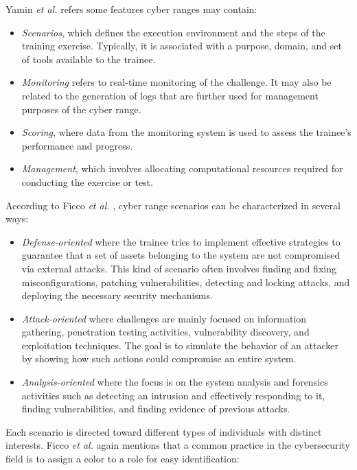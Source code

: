 Yamin \textit{et al.} \cite{cr_and_security_testbeds_ref} refers some features cyber ranges may contain:

\begin{itemize}
    \item \textit{Scenarios}, which defines the execution environment and the steps of the training exercise. Typically, it is associated with a purpose, domain, and set of tools available to the trainee.
    \item \textit{Monitoring} refers to real-time monitoring of the challenge. It may also be related to the generation of logs that are further used for management purposes of the cyber range.
    \item \textit{Scoring}, where data from the monitoring system is used to assess the trainee's performance and progress. 
    \item \textit{Management}, which involves allocating computational resources required for conducting the exercise or test. 
\end{itemize}

According to Ficco \textit{et al.} \cite{leaf_ref}, cyber range scenarios can be characterized in several ways:

\begin{itemize}
    \item \textit{Defense-oriented} where the trainee tries to implement effective strategies to guarantee that a set of assets belonging to the system are not compromised via external attacks. This kind of scenario often involves finding and fixing misconfigurations, patching vulnerabilities, detecting and locking attacks, and deploying the necessary security mechanisms.
    \item \textit{Attack-oriented} where challenges are mainly focused on information gathering, penetration testing activities, vulnerability discovery, and exploitation techniques. The goal is to simulate the behavior of an attacker by showing how such actions could compromise an entire system.
    \item \textit{Analysis-oriented} where the focus is on the system analysis and forensics activities such as detecting an intrusion and effectively responding to it, finding vulnerabilities, and finding evidence of previous attacks.
\end{itemize}

Each scenario is directed toward different types of individuals with distinct interests. Ficco \textit{et al.} \cite{leaf_ref} again mentions that a common practice in the cybersecurity field is to assign a color to a role for easy identification:

